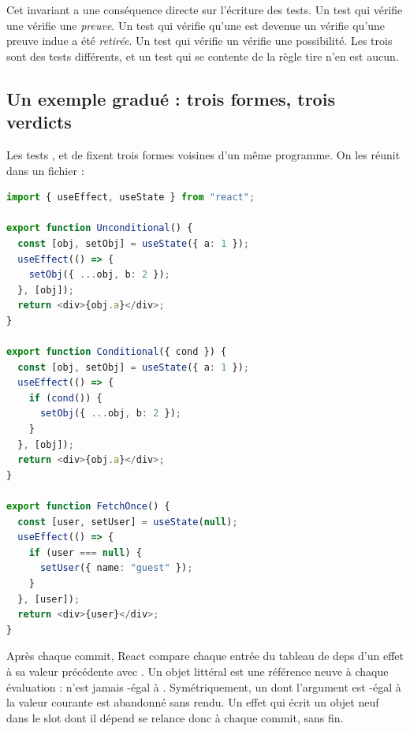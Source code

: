 Cet invariant a une conséquence directe sur l'écriture des tests. Un test qui vérifie une \Error{} vérifie une \emph{preuve}. Un test qui vérifie qu'une \Error{} est devenue un \Warning{} vérifie qu'une preuve indue a été \emph{retirée}. Un test qui vérifie un \Warning{} vérifie une possibilité. Les trois sont des tests différents, et un test qui se contente de \og la règle tire\fg{} n'en est aucun.

\subsection{Un exemple gradué : trois formes, trois verdicts}

Les tests ,  et  de  fixent trois formes voisines d'un même programme. On les réunit dans un fichier :

\begin{lstlisting}[language=TypeScript,caption={Trois formes de churn d'objet (\file{/tmp/ch25/churn.tsx}, construit d'après \src{tests/corpus_fp_fixes.rs}{472}{521})},label={lst:tests-corpus-churn}]
import { useEffect, useState } from "react";

export function Unconditional() {
  const [obj, setObj] = useState({ a: 1 });
  useEffect(() => {
    setObj({ ...obj, b: 2 });
  }, [obj]);
  return <div>{obj.a}</div>;
}

export function Conditional({ cond }) {
  const [obj, setObj] = useState({ a: 1 });
  useEffect(() => {
    if (cond()) {
      setObj({ ...obj, b: 2 });
    }
  }, [obj]);
  return <div>{obj.a}</div>;
}

export function FetchOnce() {
  const [user, setUser] = useState(null);
  useEffect(() => {
    if (user === null) {
      setUser({ name: "guest" });
    }
  }, [user]);
  return <div>{user}</div>;
}
\end{lstlisting}

\begin{react}
Après chaque commit, React compare chaque entrée du tableau de deps d'un effet à sa valeur précédente avec . Un objet littéral est une référence neuve à chaque évaluation :  n'est jamais -égal à . Symétriquement, un  dont l'argument est -égal à la valeur courante est abandonné sans rendu. Un effet qui écrit un objet neuf dans le slot dont il dépend se relance donc à chaque commit, sans fin.
\end{react}

